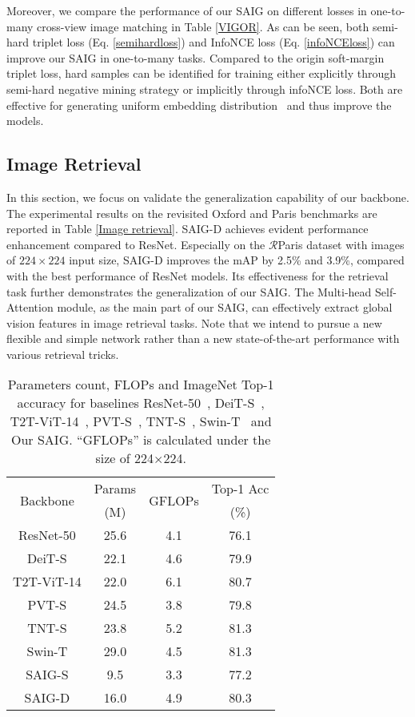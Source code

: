 \documentclass[sn-basic,iicol]{sn-jnl}
\theoremstyle{thmstyletwo}\newtheorem{example}{Example}\newtheorem{remark}{Remark}
\theoremstyle{thmstylethree}\newtheorem{definition}{Definition}
\begin{document}
Moreover, we compare the performance of our SAIG on different losses in one-to-many cross-view image matching in Table \ref{VIGOR}. As can be seen, both semi-hard triplet loss (Eq. \ref{semihardloss}) and InfoNCE loss (Eq. \ref{infoNCEloss}) can improve our SAIG in one-to-many tasks. Compared to the origin soft-margin triplet loss, hard samples can be identified for training either explicitly through semi-hard negative mining strategy or implicitly through infoNCE loss. Both are effective for generating uniform embedding distribution~\citep{wang2021understanding} and thus improve the models.





\subsection{Image Retrieval}
In this section, we focus on validate the generalization capability of our backbone. The experimental results on the revisited Oxford and Paris benchmarks are reported in Table \ref{Image retrieval}. SAIG-D achieves evident performance enhancement compared to ResNet. Especially on the $\mathcal{R}$Paris dataset with images of $224\times224$ input size, SAIG-D improves the mAP by 2.5\% and 3.9\%, compared with the best performance of ResNet models. Its effectiveness for the retrieval task further demonstrates the generalization of our SAIG. The Multi-head Self-Attention module, as the main part of our SAIG, can effectively extract global vision features in image retrieval tasks. Note that we intend to pursue a new flexible and simple network rather than a new state-of-the-art performance with various retrieval tricks. 


\begin{table}
\setlength{\abovecaptionskip}{0.2cm}
\centering
\begin{tabular}{c|c|c|c}
\toprule
\multirow{2}{*}{Backbone} & Params & \multirow{2}{*}{GFLOPs} & Top-1 Acc \\ 
 ~&(M) & ~ &(\%) \\\midrule
ResNet-50 & 25.6 & 4.1 & 76.1 \\
DeiT-S & 22.1 & 4.6 & 79.9 \\
T2T-ViT-14 & 22.0 & 6.1 & 80.7 \\
PVT-S  & 24.5 & 3.8 & 79.8 \\
TNT-S & 23.8 & 5.2 & 81.3 \\
Swin-T  & 29.0 & 4.5 & 81.3 \\\midrule
SAIG-S & 9.5 & 3.3 & 77.2\\
SAIG-D & 16.0 & 4.9 & 80.3\\ \bottomrule
\end{tabular}

\caption{Parameters count, FLOPs and ImageNet Top-1 accuracy for baselines ResNet-50~\protect\citep{heResNet2016}, DeiT-S~\protect\citep{DeiT}, T2T-ViT-14~\protect\citep{T2T-ViT2021}, PVT-S~\protect\citep{PVT2021}, TNT-S~\protect\citep{TNT2021}, Swin-T~\protect\citep{Swin-T2021} and Our SAIG. “GFLOPs” is calculated under the size of 224$\times$224.}
\label{Imagenet classification}
\end{table}
\end{document}
